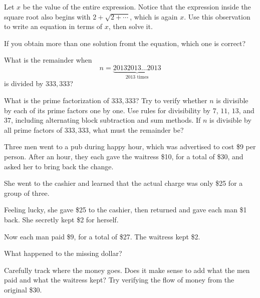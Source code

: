 \documentclass{article}
\begin{document}
\begin{hint*}
    Let \( x \) be the value of the entire expression.  
    Notice that the expression inside the square root also begins with \( 2 + \sqrt{2 + \cdots} \), which is again \( x \).  
    Use this observation to write an equation in terms of \( x \), then solve it.

    If you obtain more than one solution fromt the equation, which one is correct?
\end{hint*}


\begin{exercise}\label{example:remainder-divisibility}
    What is the remainder when 
    \[
        n = \underbrace{20132013\ldots2013}_{\text{2013 times}}
    \]
    is divided by \(333,\!333\)?
      
\end{exercise}

\begin{hint*}
    What is the prime factorization of \(333,\!333\)?  
    Try to verify whether \(n\) is divisible by each of its prime factors one by one.  
    Use rules for divisibility by \(7\), \(11\), \(13\), and \(37\), including alternating block subtraction and sum methods.  
    If \(n\) is divisible by all prime factors of \(333,\!333\), what must the remainder be?
\end{hint*}


\begin{exercise}\label{example:missing-dollar}
    Three men went to a pub during happy hour, which was advertised to cost \$9 per person. After an hour, they each gave the waitress \$10, for a total of \$30, and asked her to bring back the change.  

    She went to the cashier and learned that the actual charge was only \$25 for a group of three.  

    Feeling lucky, she gave \$25 to the cashier, then returned and gave each man \$1 back. She secretly kept \$2 for herself.  

    Now each man paid \$9, for a total of \$27. The waitress kept \$2.  

    What happened to the missing dollar?
     
\end{exercise}

\begin{hint*}
    Carefully track where the money goes. Does it make sense to add what the men paid and what the waitress kept? Try verifying the flow of money from the original \$30.
\end{hint*}
\end{document}
